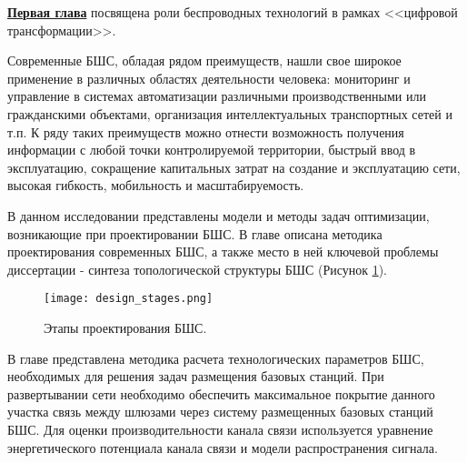 \underline{\textbf{Первая глава}} посвящена роли беспроводных технологий в рамках <<цифровой трансформации>>. 

Современные БШС, обладая рядом преимуществ, нашли свое широкое применение в различных областях деятельности человека: мониторинг и управление в системах автоматизации различными производственными или гражданскими объектами, организация интеллектуальных транспортных сетей и т.п. К ряду таких преимуществ можно отнести возможность получения информации с любой точ­ки контролируемой территории, быстрый ввод в эксплуатацию, сокращение капитальных затрат на создание и эксплуатацию сети, высокая гибкость, мо­бильность и масштабируемость. 







В данном исследовании представлены модели и методы задач оптимизации, возникающие при проектировании БШС. В главе описана методика проектирования современных БШС, а также место в ней ключевой проблемы диссертации - синтеза топологической структуры БШС (Рисунок \cref{fig:part1_design_stages}). 


\begin{figure}[h!]
    \centering
     \texttt{[image: design\_stages.png]}
  \caption{Этапы проектирования БШС.}
  \label{fig:part1_design_stages}
  \end{figure}


В главе представлена методика расчета технологических параметров БШС, необходимых для решения задач размещения базовых станций. При развертывании сети необходимо обеспечить максимальное покрытие данного участка связь между шлюзами через систему размещенных базовых станций БШС. Для оценки производительности канала связи используется уравнение энергетического потенциала канала связи и модели распространения сигнала. 

